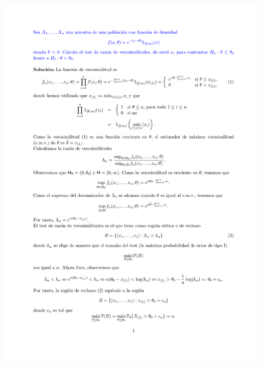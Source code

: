 \newpage
\begin{problem}[4]
\solution
\centerline{\includegraphics[page=1,scale=0.7835]{pdf/_Solucion_T5_b_P4.pdf}} %

\end{problem}

\newpage

